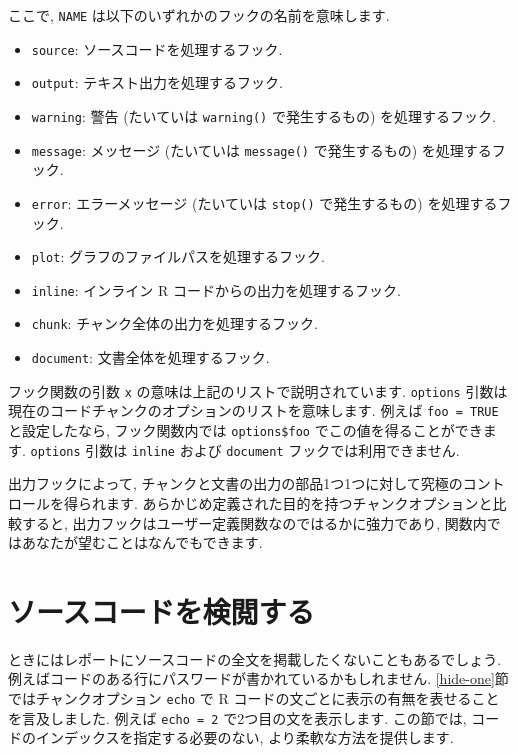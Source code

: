 \documentclass[
  11pt,
]{bxjsreport}
\begin{document}
ここで, \texttt{NAME} は以下のいずれかのフックの名前を意味します.

\begin{itemize}
\item
  \texttt{source}: ソースコードを処理するフック.
\item
  \texttt{output}: テキスト出力を処理するフック.
\item
  \texttt{warning}: 警告 (たいていは \texttt{warning()} で発生するもの) を処理するフック.
\item
  \texttt{message}: メッセージ (たいていは \texttt{message()} で発生するもの) を処理するフック.
\item
  \texttt{error}: エラーメッセージ (たいていは \texttt{stop()} で発生するもの) を処理するフック.
\item
  \texttt{plot}: グラフのファイルパスを処理するフック.
\item
  \texttt{inline}: インライン R コードからの出力を処理するフック.
\item
  \texttt{chunk}: チャンク全体の出力を処理するフック.
\item
  \texttt{document}: 文書全体を処理するフック.
\end{itemize}

フック関数の引数 \texttt{x} の意味は上記のリストで説明されています. \texttt{options} 引数は現在のコードチャンクのオプションのリストを意味します. 例えば \texttt{foo = TRUE} と設定したなら, フック関数内では \texttt{options\$foo} でこの値を得ることができます. \texttt{options} 引数は \texttt{inline} および \texttt{document} フックでは利用できません.

出力フックによって, チャンクと文書の出力の部品1つ1つに対して究極のコントロールを得られます. あらかじめ定義された目的を持つチャンクオプションと比較すると, 出力フックはユーザー定義関数なのではるかに強力であり, 関数内ではあなたが望むことはなんでもできます.

\hypertarget{hook-hide}{%
\section{ソースコードを検閲する}\label{hook-hide}}

ときにはレポートにソースコードの全文を掲載したくないこともあるでしょう. 例えばコードのある行にパスワードが書かれているかもしれません. \ref{hide-one}節ではチャンクオプション \texttt{echo} で R コードの文ごとに表示の有無を表せることを言及しました. 例えば \texttt{echo = 2} で2つ目の文を表示します. この節では, コードのインデックスを指定する必要のない, より柔軟な方法を提供します.
\end{document}
